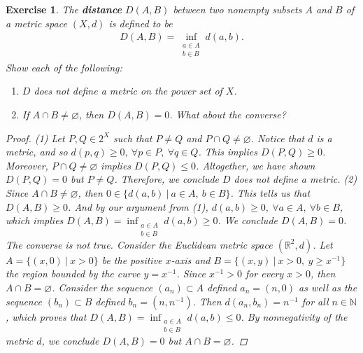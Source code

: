 \documentclass[11pt]{article}
\theoremstyle{mystyle}
\newtheorem{protoexer}{Exercise}[section]
\newenvironment{exer}
{\colorlet{shadecolor}{blue!15}\begin{shaded}\begin{protoexer}}
{\end{protoexer}\end{shaded}}
\newcommand{\0}{\mathbf{0}}
\begin{document}
\begin{exer}
The \textbf{distance} $D(A, B)$ between two nonempty subsets $A$ and $B$ of a metric space $(X, d)$ is defined to be 
\begin{align*}
   D(A, B) = \inf_{\substack{a \in A\\b \in B}} d(a, b). 
\end{align*}
Show each of the following:
\begin{enumerate}
    \item $D$ does \textit{not} define a metric on the power set of $X$.
    \item If $A \cap B \neq \varnothing$, then $D(A, B) = 0$. What about the converse?
\end{enumerate}

\begin{proof}
(1) Let $P, Q \in 2^X$ such that $P \neq Q$ and $P \cap Q \neq 
\varnothing$. Notice that $d$ is a metric, and so $d(p, q) \geq 0, \ \forall p \in P, \ \forall q \in Q$. This implies $D(P, Q) \geq 0$. Moreover, $P \cap Q \neq \varnothing$ implies $D(P, Q) \leq 0$. Altogether, we have shown $D(P, Q) = 0$ but $P \neq Q$. Therefore, we conclude $D$ does not define a metric.\newline
(2) Since $A \cap B \neq \varnothing$, then $0 \in \{ d(a, b) \ | \ a \in A, \ b \in B\}$. This tells us that $D(A, B) \geq 0$. And by our argument from (1), $d(a, b) \geq 0, \ \forall a \in A, \ \forall b \in B$, which implies $D(A, B) = \inf_{\substack{a \in A\\b \in B}} d(a, b) \geq 0$. We conclude $D(A, B) = 0$.\newline
The converse is not true. Consider the Euclidean metric space $(\mathbb{R}^2, d)$. Let $A = \{(x, 0) \ | \ x > 0 \}$ be the positive $x$-axis and $B = \{(x, y) \ | \ x >0, \ y \geq x^{-1} \}$ the region bounded by the curve $y = x^{-1}$. Since $x^{-1} > 0$ for every $x > 0$, then $A \cap B = \varnothing$. Consider the sequence $(a_n) \subset A$ defined $a_n = (n, 0)$ as well as the sequence $(b_n) \subset B$ defined $b_n = (n, n^{-1})$. Then $d(a_n, b_n) = n^{-1}$ for all $n \in \mathbb{N}$, which proves that $D(A, B) = \inf_{\substack{a \in A\\b \in B}} d(a, b) \leq 0$. By nonnegativity of the metric $d$, we conclude $D(A, B) = 0$ but $A \cap B = \varnothing$.
\end{proof}

\begin{center}
\end{center}
\end{exer}
\end{document}

